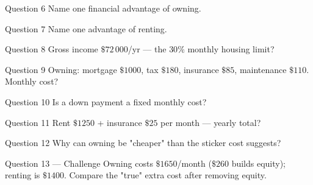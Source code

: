 \documentclass[11pt]{article}
\begin{document}
\begin{qbox}{Question 6}
Name one financial advantage of owning.\workspace{2.4cm}
\end{qbox}

\begin{qbox}{Question 7}
Name one advantage of renting.\workspace{2.4cm}
\end{qbox}

\begin{qbox}{Question 8}
Gross income $\$72\,000$/yr — the $30\%$ monthly housing limit?\workspace{2.4cm}
\end{qbox}

\begin{qbox}{Question 9}
Owning: mortgage $\$1000$, tax $\$180$, insurance $\$85$, maintenance $\$110$. Monthly cost?\workspace{2.4cm}
\end{qbox}

\begin{qbox}{Question 10}
Is a down payment a fixed monthly cost?\workspace{2.4cm}
\end{qbox}

\begin{qbox}{Question 11}
Rent $\$1250$ + insurance $\$25$ per month — yearly total?\workspace{2.4cm}
\end{qbox}

\begin{qbox}{Question 12}
Why can owning be "cheaper" than the sticker cost suggests?\workspace{2.4cm}
\end{qbox}

\begin{qbox}{Question 13 --- Challenge}
Owning costs $\$1650$/month ($\$260$ builds equity); renting is $\$1400$. Compare the "true" extra cost after removing equity.\workspace{3cm}
\end{qbox}

\clearpage
{}
\end{document}
